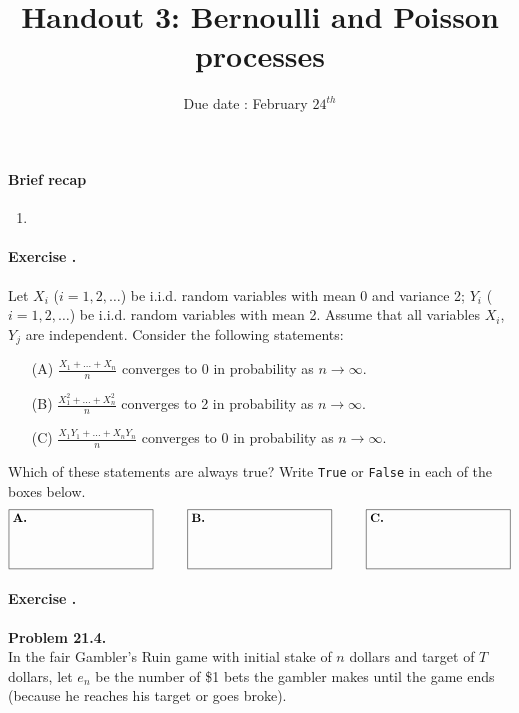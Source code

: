 \documentclass[article,12pt,a4paper]{article}
\title{ \bfseries \Huge {Handout 3: Bernoulli and Poisson processes }}
\date{Due date : February $24^{th}$}
\newcounter{num}  %
\begin{document}
	\maketitle
	\setcounter{num}{1}  %
	
	\thispagestyle{empty} 
	\paragraph{Brief recap}
	\begin{enumerate}
		\item 
	\end{enumerate}
	
	
		
		\paragraph{Exercise \thenum.}
		Let $X_i$ ($i = 1, 2, \dots$) be i.i.d. random variables with mean 0 and variance 2; $Y_i$ ($i = 1, 2, \dots$) be i.i.d. random variables with mean 2. Assume that all variables $X_i$, $Y_j$ are independent. Consider the following statements:
		
		\begin{enumerate}
			\item[(A)] $\frac{X_1 + \dots + X_n}{n}$ converges to 0 in probability as $n \to \infty$.
			\item[(B)] $\frac{X_1^2 + \dots + X_n^2}{n}$ converges to 2 in probability as $n \to \infty$.
			\item[(C)] $\frac{X_1 Y_1 + \dots + X_n Y_n}{n}$ converges to 0 in probability as $n \to \infty$.
		\end{enumerate}
		
		Which of these statements are always true? Write \texttt{True} or \texttt{False} in each of the boxes below.
		\[
		\fbox{\parbox[c][1.5cm][t]{4cm}{\textbf{A.} \hspace{0.5cm}}} \hspace{1cm} 
		\fbox{\parbox[c][1.5cm][t]{4cm}{\textbf{B.} \hspace{0.5cm}}} \hspace{1cm} 
		\fbox{\parbox[c][1.5cm][t]{4cm}{\textbf{C.} \hspace{0.5cm}}}
		\]
		
		
		\paragraph{Exercise \thenum.}	
			\textbf{Problem 21.4.} \\
			In the fair Gambler's Ruin game with initial stake of $n$ dollars and target of $T$ dollars, let $e_n$ be the number of \$1 bets the gambler makes until the game ends (because he reaches his target or goes broke).
			
\end{document}
